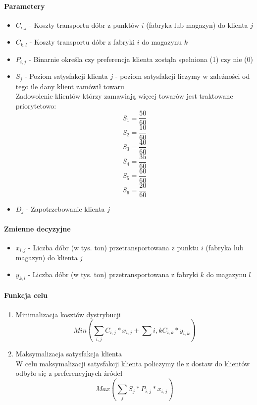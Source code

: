 \documentclass[12pt]{article}
\begin{document}
\paragraph{Parametery}
\begin{itemize}
    \item $C_{i, j}$ - Koszty transportu dóbr z punktów $i$ (fabryka lub magazyn) do klienta $j$
    \item $C_{k, l}$ - Koszty transportu dóbr z fabryki $i$ do magazynu $k$ 
    \item $P_{i, j}$ - Binarnie określa czy preferencja klienta zostąła spełniona (1) czy nie (0)
    \item $S_j$ - Poziom satysfakcji klienta $j$ - poziom satysfakcji liczymy w zależności od tego ile dany klient zamówił towaru \\ 
    Zadowolenie klientów którzy zamawiają więcej towarów jest traktowane priorytetowo:
    \[ S_1 = \frac{50}{60}  \]
    \[ S_2 = \frac{10}{60}  \]
    \[ S_3 = \frac{40}{60}  \]
    \[ S_4 = \frac{35}{60}  \]
    \[ S_5 = \frac{60}{60}  \]
    \[ S_6 = \frac{20}{60}  \]
    \item $D_j$ - Zapotrzebowanie klienta $j$
\end{itemize}
\paragraph{Zmienne decyzyjne}
\begin{itemize}
    \item $x_{i,j}$ - Liczba dóbr (w tys. ton) przetransportowana z punktu $i$ (fabryka lub magazyn) do klienta $j$
    \item $y_{k, l}$ - Liczba dóbr (w tys. ton) przetransportowana z fabryki $k$ do magazynu $l$
\end{itemize} 
\paragraph{Funkcja celu}
\begin{enumerate}
    \item Minimalizacja kosztów dystrybucji \\ 
    \[ Min(\sum_{i, j} C_{i, j} * x_{i, j} + \sum{i, k} C_{i, k} * y_{i, k}) \]
    \item Maksymalizacja satysfakcja klienta \\ 
    W celu maksymalizacji satysfakcji klienta policzymy ile z dostaw do klientów odbyło się z preferencyjnych źródeł \\
    \[ Max(\sum_{j} S_j * P_{i,j} * x_{i, j}) \] 
\end{enumerate}
\end{document}
